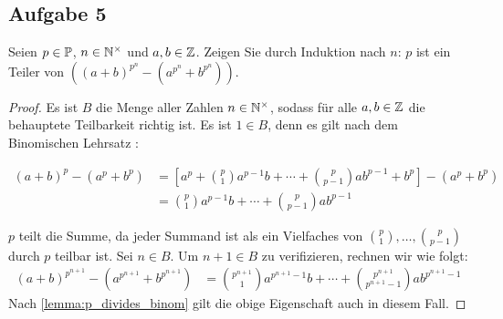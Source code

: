 \subsection{Aufgabe 5}
Seien $p \in \mathbb{P}{}$, $n \in \mathbb{N}^\times{}$ und $a,b \in \mathbb{Z}{}$. Zeigen Sie durch Induktion
nach $n$: $p$ ist ein Teiler von
$((a + b)^{p^n} - (a^{p^n} + b^{p^n}))$.
\begin{proof}
  Es ist $B$ die Menge aller Zahlen $n \in \mathbb{N}^\times{}$,
  sodass für alle $a,b \in \mathbb{Z}{}$ die behauptete Teilbarkeit richtig ist.
  Es ist $1 \in B$, denn es gilt nach dem Binomischen Lehrsatz
  \parencite[19]{book:zahlentheorie}:
  \begin{widemath}
    \begin{equation*}
      \begin{aligned}
        (a + b)^p - (a^p + b^p) & =
        \left[a^p + \binom{p}{1}a^{p-1}b + \dotsb + \binom{p}{p - 1}ab^{p-1} + b^p\right] - (a^p + b^p) \\
                                & = \binom{p}{1}a^{p-1}b + \dotsb + \binom{p}{p - 1}ab^{p-1}
      \end{aligned}
    \end{equation*}
  \end{widemath}
  $p$ teilt die Summe, da jeder Summand ist als ein Vielfaches
  von $\binom{p}{1},\dotsc,\binom{p}{p - 1}$ durch $p$ teilbar ist.
  Sei $n \in B$. Um $n + 1 \in B$ zu verifizieren, rechnen wir wie folgt:
  \begin{equation*}
    \begin{aligned}
      (a + b)^{p^{n+1}} - (a^{p^{n+1}} + b^{p^{n+1}}) & =
      \binom{p^{n+1}}{1}a^{p^{n+1}-1}b + \dotsb + \binom{p^{n+1}}{p^{n+1} - 1}ab^{p^{n+1}-1}
    \end{aligned}
  \end{equation*}
  Nach \autoref{lemma:p_divides_binom} gilt die obige Eigenschaft auch in diesem Fall.
\end{proof}

